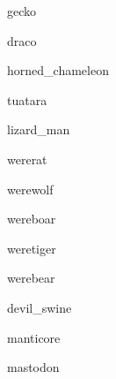 \documentclass[letterpaper,serif]{module}
\begin{document}
\begin{newmonster}{gecko}\end{newmonster}

\begin{newmonster}{draco}\end{newmonster}

\begin{newmonster}{horned_chameleon}\end{newmonster}

\begin{newmonster}{tuatara}\end{newmonster}

\begin{newmonster}{lizard_man}\end{newmonster}


\begin{newmonster}{wererat}\end{newmonster}

\begin{newmonster}{werewolf}\end{newmonster}

\begin{newmonster}{wereboar}\end{newmonster}

\begin{newmonster}{weretiger}\end{newmonster}

\begin{newmonster}{werebear}\end{newmonster}

\begin{newmonster}{devil_swine}\end{newmonster}

\begin{newmonster}{manticore}\end{newmonster}

\begin{newmonster}{mastodon}\end{newmonster}
\end{document}
